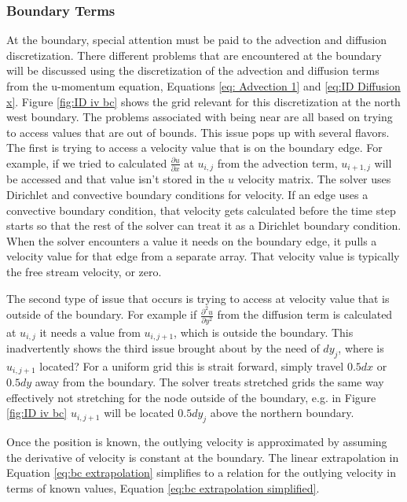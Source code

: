 \documentclass[onehalf,11pt]{beavtex}
\begin{document}
\subsubsection{Boundary Terms}
At the boundary, special attention must be paid to the advection and diffusion discretization.
There different problems that are encountered at the boundary will be discussed using the discretization of the advection and diffusion terms from the u-momentum equation, Equations \eqref{eq: Advection 1} and \eqref{eq:ID Diffusion x}.
Figure \ref{fig:ID iv bc} shows the grid relevant for this discretization at the north west boundary. 
The problems associated with being near are all based on trying to access values that are out of bounds.
This issue pops up with several flavors.
The first is trying to access a velocity value that is on the boundary edge.
For example, if we tried to calculated $\frac{\partial u}{\partial x}$ at $u_{i,j}$ from the advection term, $u_{i+1,j}$ will be accessed and that value isn't stored in the $u$ velocity matrix.
The solver uses Dirichlet and convective boundary conditions for velocity.
If an edge uses a convective boundary condition, that velocity gets calculated before the time step starts so that the rest of the solver can treat it as a Dirichlet boundary condition.
When the solver encounters a value it needs on the boundary edge, it pulls a velocity value for that edge from a separate array.
That velocity value is typically the free stream velocity, or zero.

The second type of issue that occurs is trying to access at velocity value that is outside of the boundary. 
For example if $\frac{\partial^2 u}{\partial y^2}$ from the diffusion term is calculated at $u_{i,j}$ it needs a value from $u_{i,j+1}$, which is outside the boundary.
This inadvertently shows the third issue brought about by the need of $dy_j$, where is $u_{i,j+1}$ located?
For a uniform grid this is strait forward, simply travel $0.5dx$ or $0.5dy$ away from the boundary.
The solver treats stretched grids the same way effectively not stretching for the node outside of the boundary, e.g. in Figure \ref{fig:ID iv bc} $u_{i,j+1}$ will be located $0.5dy_j$ above the northern boundary.

Once the position is known, the outlying velocity is approximated by assuming the derivative of velocity is constant at the boundary. 
The linear extrapolation in Equation \eqref{eq:bc extrapolation} simplifies to a relation for the outlying velocity in terms of known values, Equation \eqref{eq:bc extrapolation simplified}.
\end{document}
